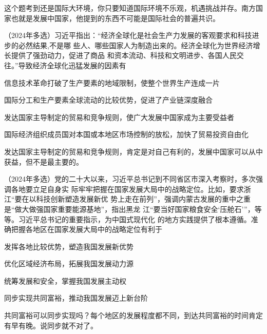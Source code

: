 \documentclass[lang=cn,blue,10pt,scheme=chinese,twocol]{zznote}
\begin{document}
\begin{solution}
	这个题考到还是国际大环境，你只要知道国际环境不乐观，机遇挑战并存。南方国家也就是发展中国家，他提到的东西不可能是国际社会的普遍共识。
\end{solution}
\begin{example}	（2024年多选）习近平指出：“经济全球化是社会生产力发展的客观要求和科技进步的必然结果,不是哪 些人、哪些国家人为制造出来的。经济全球化为世界经济增长提供了强劲动力，促进了商品 和资本流动、科技和文明进步、各国人民交往。”导致经济全球化迅猛发展的因素有

	\begin{choice}
		\item 信息技术革命打破了生产要素的地域限制，使整个世界生产连成一片
		\item 国际分工和生产要素全球流动的比较优势，促进了产业链深度融合
		\item 发达国家主导制定的贸易和竞争规则，使广大发展中国家成为主要受益者
		\item 国际经济组织成员国对本国或本地区市场控制的放松，加快了贸易投资自由化
	\end{choice}
\end{example}
\begin{solution}
	发达国家主导制定的贸易和竞争规则，肯定是对自己有利的，发展中国家可以从中获益，但不是最主要的。
\end{solution}
\begin{example} （2024年多选）党的二十大以来，习近平总书记到不同省区市深入考察时，多次强调各地要立足自身实 际牢牢把握在国家发展大局中的战略定位。比如，要求浙江“要在以科技创新塑造发展新优 势上走在前列”，强调内蒙古发展的重中之重是“做大做强国家重要能源基地”，指出黑龙 江“要当好国家粮食安全‘压舱石’”，等等。习近平总书记的重要指示，为中国式现代化 的地方实践提供了根本遵循。准确把握各地区在国家发展大局中的战略定位有利于
	\begin{choice}
		\item 发挥各地比较优势，塑造我国发展新优势
		\item 优化区域经济布局，拓展我国发展动力源
		\item  统筹发展和安全，掌握我国发展主动权
		\item 同步实现共同富裕，推动我国发展迈上新台阶
	\end{choice}
\end{example}
\begin{solution}
	共同富裕可以同步实现吗？每个地区的发展程度都不同，到达共同富裕的时间肯定有早有晚。说同步就不对了。
\end{solution}
\end{document}
